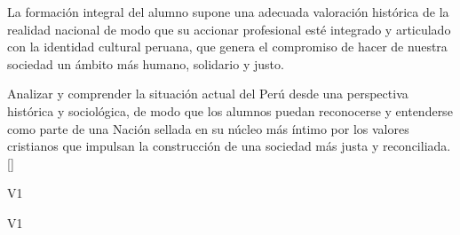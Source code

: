 \begin{syllabus}


\begin{justification}
La formación integral del alumno supone una adecuada valoración histórica de la realidad nacional de modo que su accionar profesional esté integrado y articulado con la identidad cultural peruana, que genera el compromiso de hacer de nuestra sociedad un ámbito más humano, solidario y justo.
\end{justification}

\begin{goals}
\item Analizar y comprender la situación actual del Perú desde una perspectiva histórica y sociológica, de modo que los alumnos puedan reconocerse y entenderse como parte de una Nación sellada en su núcleo más íntimo por los valores cristianos que impulsan la construcción de una sociedad más justa y reconciliada.  [\Familiarity]
\end{goals}

\begin{outcomes}{V1}
    \item {}
    \item {}
\end{outcomes}

\begin{competences}{V1}
    \item {}
\end{competences}


\end{syllabus}
